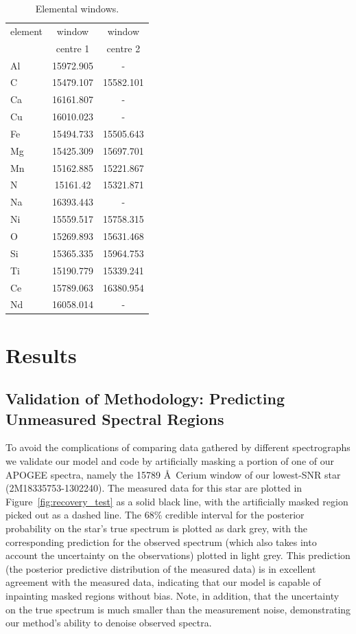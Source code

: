 \documentclass[a4paper,fleqn,usenatbib]{mnras}
\begin{document}
\begin{table}
    \centering
    \caption{Elemental windows.}
    \label{tab:window_centres}
    \begin{tabular}{lcc}
        \hline
        element & window & window \\
         & centre 1 & centre 2 \\
        \hline
        Al & 15972.905 & - \\
        C & 15479.107 & 15582.101 \\
        Ca & 16161.807 & - \\
        Cu & 16010.023 & - \\
        Fe & 15494.733 & 15505.643 \\
        Mg & 15425.309 & 15697.701 \\
        Mn & 15162.885 & 15221.867 \\
        N & 15161.42 & 15321.871 \\
        Na & 16393.443 & - \\
        Ni & 15559.517 & 15758.315 \\
        O & 15269.893 & 15631.468 \\
        Si & 15365.335 & 15964.753 \\
        Ti & 15190.779 & 15339.241 \\
        Ce & 15789.063 & 16380.954 \\
        Nd & 16058.014 & - \\
        \hline
    \end{tabular}
\end{table}


\section{Results}

\subsection{Validation of Methodology: Predicting Unmeasured Spectral Regions}

To avoid the complications of comparing data gathered by different spectrographs we validate our model and code by artificially masking a portion of one of our APOGEE spectra, namely the 15789 \AA\ Cerium window of our lowest-SNR star (2M18335753-1302240). The measured data for this star are plotted in Figure~\ref{fig:recovery_test} as a solid black line, with the artificially masked region picked out as a dashed line. The 68\% credible interval for the posterior probability on the star's true spectrum is plotted as dark grey, with the corresponding prediction for the observed spectrum (which also takes into account the uncertainty on the observations) plotted in light grey. This prediction (the posterior predictive distribution of the measured data) is in excellent agreement with the measured data, indicating that our model is capable of inpainting masked regions without bias. Note, in addition, that the uncertainty on the true spectrum is much smaller than the measurement noise, demonstrating our method's ability to denoise observed spectra.
\end{document}
